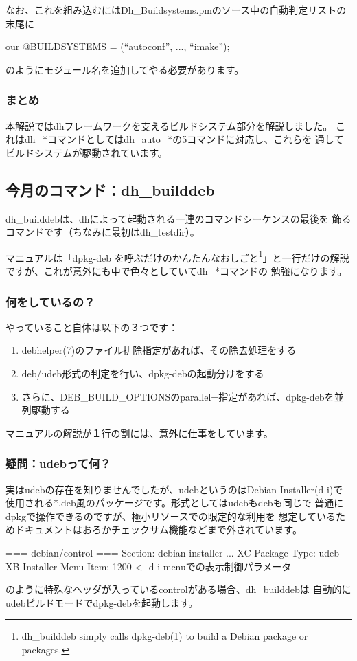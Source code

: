 \documentclass[mingoth,a4paper]{jsarticle}
\begin{document}
なお、これを組み込むにはDh\_Buildsystems.pmのソース中の自動判定リストの
末尾に
\begin{commandline}
our @BUILDSYSTEMS = (``autoconf'', ..., ``imake'');
\end{commandline}
のようにモジュール名を追加してやる必要があります。

\subsubsection{まとめ}
本解説ではdhフレームワークを支えるビルドシステム部分を解説しました。
これはdh\_*コマンドとしてはdh\_auto\_*の5コマンドに対応し、これらを
通してビルドシステムが駆動されています。

\subsection{今月のコマンド：dh\_builddeb}

dh\_builddebは、dhによって起動される一連のコマンドシーケンスの最後を
飾るコマンドです（ちなみに最初はdh\_testdir）。

マニュアルは「dpkg-deb を呼ぶだけのかんたんなおしごと\footnote{
dh\_builddeb simply calls dpkg-deb(1) to build a Debian package or packages.
}」と一行だけの解説ですが、これが意外にも中で色々としていてdh\_*コマンドの
勉強になります。

\subsubsection{何をしているの？}

やっていること自体は以下の３つです：
\begin{enumerate}
\item debhelper(7)のファイル排除指定があれば、その除去処理をする
\item deb/udeb形式の判定を行い、dpkg-debの起動分けをする
\item さらに、DEB\_BUILD\_OPTIONSのparallel=指定があれば、dpkg-debを並列駆動する
\end{enumerate}
マニュアルの解説が１行の割には、意外に仕事をしています。

\subsubsection{疑問：udebって何？}
実はudebの存在を知りませんでしたが、udebというのはDebian Installer(d-i)で
使用される*.deb風のパッケージです。形式としてはudebもdebも同じで
普通にdpkgで操作できるのですが、極小リソースでの限定的な利用を
想定しているためドキュメントはおろかチェックサム機能などまで外されています。
\begin{commandline}
=== debian/control ===
Section: debian-installer
...
XC-Package-Type: udeb
XB-Installer-Menu-Item: 1200 <- d-i menuでの表示制御パラメータ
\end{commandline}
のように特殊なヘッダが入っているcontrolがある場合、dh\_builddebは
自動的にudebビルドモードでdpkg-debを起動します。
\end{document}
